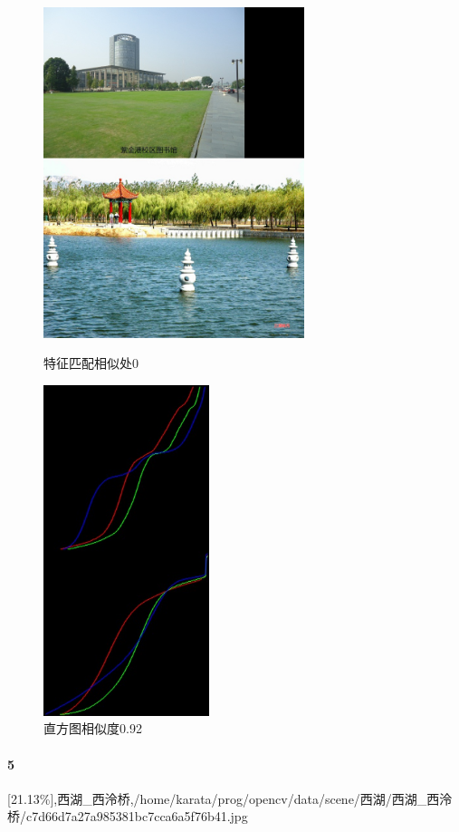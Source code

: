 \begin{figure}[htb]
\begin{minipage}[t]{0.5\linewidth}
\centering
\includegraphics[height=3.8in]{紫金港图书馆.jpg.d/im4sift.jpg}
\caption{特征匹配相似处0}
\label{fig:side:a}
\end{minipage}%
\begin{minipage}[t]{0.5\linewidth}
\centering
\includegraphics[height=3.8in]{紫金港图书馆.jpg.d/im4hist2.jpg}
\caption{直方图相似度0.92}
\label{fig:side:a}
\end{minipage}%
\end{figure}

\paragraph{5}
[21.13\%],西湖\_西泠桥,/home/karata/prog/opencv/data/scene/西湖/西湖\_西泠桥/c7d66d7a27a985381bc7cca6a5f76b41.jpg

